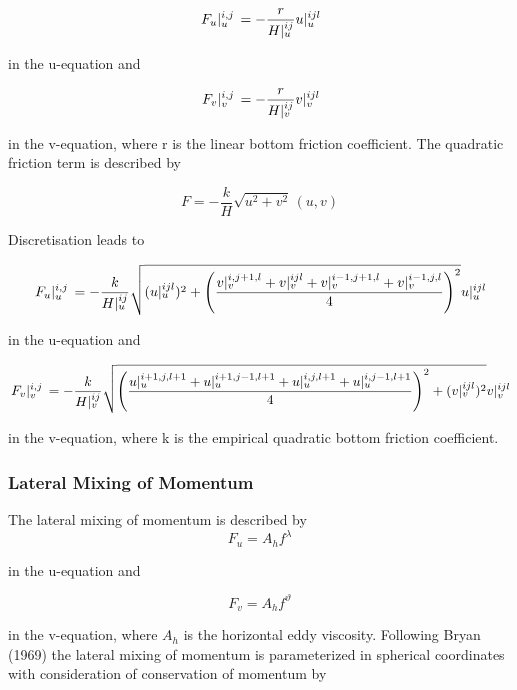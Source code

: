 \documentclass[a4paper]{article}
\begin{document}
\begin{equation}
  \,{F_u}\vert_{u}^{{i},{j}}\, = -\frac r{H\vert^{ij}_u} u\vert^{ijl}_u
\end{equation}

in the u-equation and 

\begin{equation}
  \,{F_v}\vert_{v}^{{i},{j}}\, = -\frac r{H\vert^{ij}_v} v\vert^{ijl}_v
\end{equation}

in the v-equation, where r is the linear bottom friction coefficient.
The quadratic friction term is described by

\begin{equation}
  F = -\frac kH \sqrt{u^2+v^2}\,(u,v)
\end{equation}

Discretisation leads to

\begin{equation}
  \,{F_u}\vert_{u}^{{i},{j}}\, = -\frac k{H\vert^{ij}_u} \sqrt{(u\vert^{ijl}_u)^2+\left(\frac{v\vert^{i,j+1,l}_v+v\vert^{ijl}_v+v\vert^{i-1,j+1,l}_v+v\vert^{i-1,j,l}_v}4\right)^2}u\vert^{ijl}_u
\end{equation}

in the u-equation and 

\begin{equation}
  \,{F_v}\vert_{v}^{{i},{j}}\, = -\frac k{H\vert^{ij}_v} \sqrt{\left(\frac{u\vert^{i+1,j,l+1}_u+u\vert^{i+1,j-1,l+1}_u+u\vert^{i,j,l+1}_u+u\vert^{i,j-1,l+1}_u}4\right)^2+(v\vert^{ijl}_v)^2}v\vert^{ijl}_v
\end{equation}

in the v-equation, where k is the empirical quadratic bottom friction coefficient.

\subsubsection{Lateral Mixing of Momentum}

The lateral mixing of momentum is described by
\begin{equation}
  F_u=A_hf^\lambda
\end{equation}

in the u-equation and 

\begin{equation}
  F_v=A_hf^\vartheta
\end{equation}

in the v-equation, where $A_h$ is the horizontal eddy viscosity. Following Bryan (1969) the lateral mixing of momentum is
parameterized in spherical coordinates with consideration of conservation of
momentum by
\end{document}
